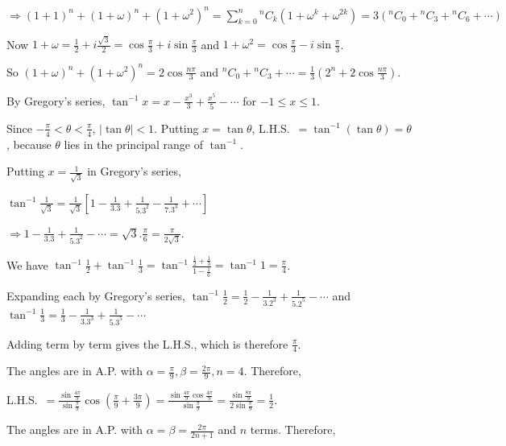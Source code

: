   $\Rightarrow (1 + 1)^n + (1 + \omega)^n + \left(1 + \omega^2\right)^n = \displaystyle\sum_{k = 0}^n{}^nC_k\left(1
  + \omega^k + \omega^{2k}\right) = 3\left({}^nC_0 + {}^nC_3 + {}^nC_6 + \cdots\right)$

  Now $1 + \omega = \frac{1}{2} + i\frac{\sqrt{3}}{2} = \cos\frac{\pi}{3} + i\sin\frac{\pi}{3}$ and $1 +
  \omega^2 = \cos\frac{\pi}{3} - i\sin\frac{\pi}{3}$.

  So $(1 + \omega)^n + \left(1 + \omega^2\right)^n = 2\cos\frac{n\pi}{3}$ and ${}^nC_0 + {}^nC_3 + \cdots =
  \frac{1}{3}\left(2^n + 2\cos\frac{n\pi}{3}\right)$.
\item By Gregory's series, $\tan^{-1}x = x - \frac{x^3}{3} + \frac{x^5}{5} - \cdots$ for $-1 \leq x \leq 1$.

  Since $-\frac{\pi}{4} < \theta < \frac{\pi}{4}$, $|\tan\theta| < 1$. Putting $x = \tan\theta$, L.H.S.\ $=
  \tan^{-1}(\tan\theta) = \theta$, because $\theta$ lies in the principal range of $\tan^{-1}$.
\item Putting $x = \frac{1}{\sqrt{3}}$ in Gregory's series,

  $\tan^{-1}\frac{1}{\sqrt{3}} = \frac{1}{\sqrt{3}}\left[1 - \frac{1}{3.3} + \frac{1}{5.3^2} - \frac{1}{7.3^3}
  + \cdots\right]$

  $\Rightarrow 1 - \frac{1}{3.3} + \frac{1}{5.3^2} - \cdots = \sqrt{3}.\frac{\pi}{6} = \frac{\pi}{2\sqrt{3}}$.
\item We have $\tan^{-1}\frac{1}{2} + \tan^{-1}\frac{1}{3} = \tan^{-1}\frac{\frac{1}{2} + \frac{1}{3}}{1 -
    \frac{1}{6}} = \tan^{-1}1 = \frac{\pi}{4}$.

  Expanding each by Gregory's series, $\tan^{-1}\frac{1}{2} = \frac{1}{2} - \frac{1}{3.2^3} + \frac{1}{5.2^5}
  - \cdots$ and $\tan^{-1}\frac{1}{3} = \frac{1}{3} - \frac{1}{3.3^3} + \frac{1}{5.3^5} - \cdots$

  Adding term by term gives the L.H.S., which is therefore $\frac{\pi}{4}$.
\item The angles are in A.P. with $\alpha = \frac{\pi}{9}, \beta = \frac{2\pi}{9}, n = 4$. Therefore,

  L.H.S.\ $= \frac{\sin\frac{4\pi}{9}}{\sin\frac{\pi}{9}}\cos\left(\frac{\pi}{9} + \frac{3\pi}{9}\right) =
  \frac{\sin\frac{4\pi}{9}\cos\frac{4\pi}{9}}{\sin\frac{\pi}{9}} = \frac{\sin\frac{8\pi}{9}}{2\sin\frac{\pi}{9}}
  = \frac{1}{2}$.
\item The angles are in A.P. with $\alpha = \beta = \frac{2\pi}{2n + 1}$ and $n$ terms. Therefore,

